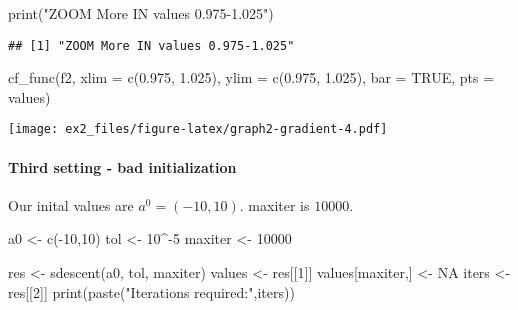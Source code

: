 \documentclass[
]{article}
\newenvironment{Shaded}{\begin{snugshade}}{\end{snugshade}}
\newcommand{\AttributeTok}[1]{\textcolor[rgb]{0.77,0.63,0.00}{#1}}
\newcommand{\ConstantTok}[1]{\textcolor[rgb]{0.00,0.00,0.00}{#1}}
\newcommand{\DecValTok}[1]{\textcolor[rgb]{0.00,0.00,0.81}{#1}}
\newcommand{\FloatTok}[1]{\textcolor[rgb]{0.00,0.00,0.81}{#1}}
\newcommand{\FunctionTok}[1]{\textcolor[rgb]{0.00,0.00,0.00}{#1}}
\newcommand{\NormalTok}[1]{#1}
\newcommand{\OtherTok}[1]{\textcolor[rgb]{0.56,0.35,0.01}{#1}}
\newcommand{\SpecialCharTok}[1]{\textcolor[rgb]{0.00,0.00,0.00}{#1}}
\newcommand{\StringTok}[1]{\textcolor[rgb]{0.31,0.60,0.02}{#1}}
\begin{document}
\begin{Shaded}
\begin{Highlighting}[]
\FunctionTok{print}\NormalTok{(}\StringTok{"ZOOM More IN values 0.975{-}1.025"}\NormalTok{)}
\end{Highlighting}
\end{Shaded}

\begin{verbatim}
## [1] "ZOOM More IN values 0.975-1.025"
\end{verbatim}

\begin{Shaded}
\begin{Highlighting}[]
\FunctionTok{cf\_func}\NormalTok{(f2, }\AttributeTok{xlim =} \FunctionTok{c}\NormalTok{(}\FloatTok{0.975}\NormalTok{, }\FloatTok{1.025}\NormalTok{), }\AttributeTok{ylim =} \FunctionTok{c}\NormalTok{(}\FloatTok{0.975}\NormalTok{, }\FloatTok{1.025}\NormalTok{), }\AttributeTok{bar =} \ConstantTok{TRUE}\NormalTok{, }\AttributeTok{pts =}\NormalTok{ values)}
\end{Highlighting}
\end{Shaded}

\texttt{[image: ex2\_files/figure-latex/graph2-gradient-4.pdf]}

\hypertarget{third-setting---bad-initialization}{%
\paragraph{Third setting - bad
initialization}\label{third-setting---bad-initialization}}

Our inital values are \(a^{0}=(-10, 10)\). maxiter is \(10000\).

\begin{Shaded}
\begin{Highlighting}[]
\NormalTok{a0 }\OtherTok{\textless{}{-}} \FunctionTok{c}\NormalTok{(}\SpecialCharTok{{-}}\DecValTok{10}\NormalTok{,}\DecValTok{10}\NormalTok{)}
\NormalTok{tol }\OtherTok{\textless{}{-}} \DecValTok{10}\SpecialCharTok{\^{}{-}}\DecValTok{5}
\NormalTok{maxiter }\OtherTok{\textless{}{-}} \DecValTok{10000}

\NormalTok{res }\OtherTok{\textless{}{-}} \FunctionTok{sdescent}\NormalTok{(a0, tol, maxiter)}
\NormalTok{values }\OtherTok{\textless{}{-}}\NormalTok{ res[[}\DecValTok{1}\NormalTok{]]}
\NormalTok{values[maxiter,] }\OtherTok{\textless{}{-}} \ConstantTok{NA}
\NormalTok{iters }\OtherTok{\textless{}{-}}\NormalTok{ res[[}\DecValTok{2}\NormalTok{]]}
\FunctionTok{print}\NormalTok{(}\FunctionTok{paste}\NormalTok{(}\StringTok{"Iterations required:"}\NormalTok{,iters))}
\end{Highlighting}
\end{Shaded}
\end{document}
